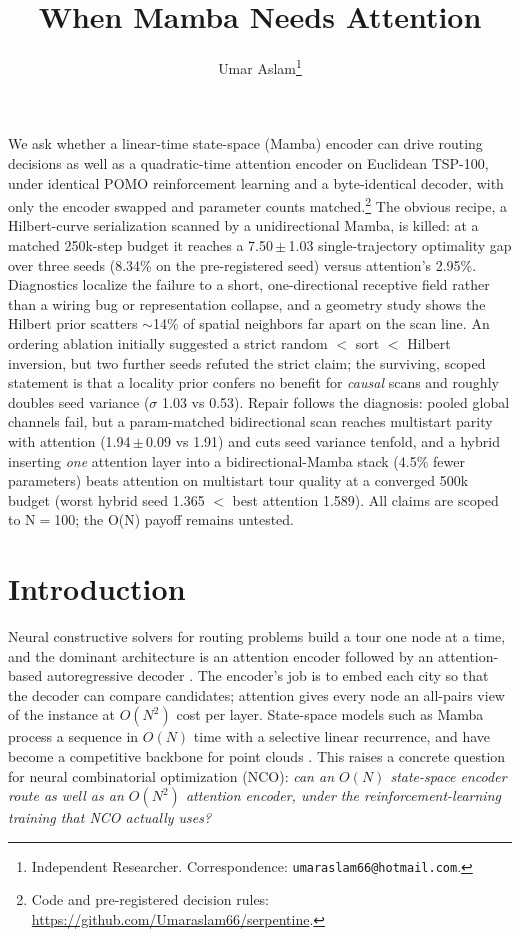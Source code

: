 \documentclass[11pt]{article}
\title{When Mamba Needs Attention}
\author{Umar Aslam\thanks{Independent Researcher. Correspondence: \texttt{umaraslam66@hotmail.com}.}}
\affil{Independent Researcher}
\date{}
\renewenvironment{abstract}{%
  \small
  \begin{mdframed}[style=abstractstyle]%
  \noindent{\bfseries\color{accent}\abstractname.}\hspace{0.6em}\ignorespaces
}{%
  \end{mdframed}}
\newcommand{\pct}{\%}
\begin{document}
\maketitle

\begin{abstract}
We ask whether a linear-time state-space (Mamba) encoder can drive routing
decisions as well as a quadratic-time attention encoder on Euclidean TSP-100,
under identical POMO reinforcement learning and a byte-identical decoder, with
only the encoder swapped and parameter counts matched.\footnote{Code and
pre-registered decision rules: \url{https://github.com/Umaraslam66/serpentine}.}
The obvious recipe, a Hilbert-curve serialization scanned by a unidirectional
Mamba, is killed: at a matched 250k-step budget it reaches a 7.50\,$\pm$\,1.03
single-trajectory optimality gap over three seeds (8.34\pct{} on the
pre-registered seed) versus attention's 2.95\pct. Diagnostics
localize the failure to a short, one-directional receptive field rather than a
wiring bug or representation collapse, and a geometry study shows the Hilbert
prior scatters $\sim$14\pct{} of spatial neighbors far apart on the scan line.
An ordering ablation initially suggested a strict random $<$ sort $<$ Hilbert
inversion, but two further seeds refuted the strict claim; the surviving,
scoped statement is that a locality prior confers no benefit for \emph{causal}
scans and roughly doubles seed variance ($\sigma$ 1.03 vs 0.53). Repair follows
the diagnosis: pooled global channels fail, but a param-matched bidirectional
scan reaches multistart parity with attention (1.94\,$\pm$\,0.09 vs 1.91) and
cuts seed variance tenfold, and a hybrid inserting \emph{one} attention layer
into a bidirectional-Mamba stack (4.5\pct{} fewer parameters) beats attention on
multistart tour quality at a converged 500k budget (worst hybrid seed 1.365 $<$
best attention 1.589). All claims are scoped to N$=$100; the O(N) payoff remains
untested.
\end{abstract}

\section{Introduction}

Neural constructive solvers for routing problems build a tour one node at a
time, and the dominant architecture is an attention encoder followed by an
attention-based autoregressive decoder \citep{kool2019,pomo2020}. The encoder's
job is to embed each city so that the decoder can compare candidates; attention
gives every node an all-pairs view of the instance at $O(N^2)$ cost per layer.
State-space models such as Mamba \citep{mamba2023,s4-2022} process a sequence in
$O(N)$ time with a selective linear recurrence, and have become a competitive
backbone for point clouds \citep{pointmamba2024,ptv3-2024,pcm2025}. This raises
a concrete question for neural combinatorial optimization (NCO): \emph{can an
$O(N)$ state-space encoder route as well as an $O(N^2)$ attention encoder, under
the reinforcement-learning training that NCO actually uses?}
\end{document}
